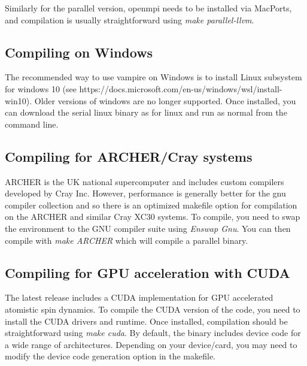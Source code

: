 Similarly for the parallel version, openmpi needs to be installed via MacPorts, and compilation is usually straightforward using \textit{make parallel-llvm}.

\subsection*{Compiling on Windows}
The recommended way to use vampire on Windows is to install Linux subsystem for windows 10 (see https://docs.microsoft.com/en-us/windows/wsl/install-win10). Older versions of windows are no longer supported. Once installed, you can download the serial linux binary as for linux and run as normal from the command line.



\subsection*{Compiling for ARCHER/Cray systems}
ARCHER is the UK national supercomputer and includes custom compilers developed by Cray Inc. However, performance is generally better for the gnu compiler collection and so there is an optimized makefile option for compilation on the ARCHER and similar Cray XC30 systems. To compile, you need to swap the environment to the GNU compiler suite using \textit{Enswap Gnu}. You can then compile with \textit{make ARCHER} which will compile a parallel binary.

\subsection*{Compiling for GPU acceleration with CUDA}
The latest release includes a CUDA implementation for GPU accelerated atomistic spin dynamics. To compile the CUDA version of the code, you need to install the CUDA drivers and runtime. Once installed, compilation should be straightforward using \textit{make cuda}. By default, the binary includes device code for a wide range of architectures. Depending on your device/card, you may need to modify the device code generation option in the makefile.

